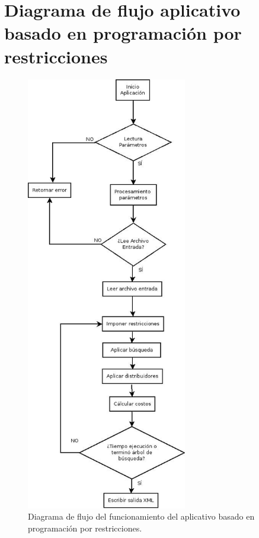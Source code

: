 \section*{Diagrama de flujo aplicativo basado en programación por restricciones} \label{flujoApp}

\begin{figure}[H]
	\centering
	\includegraphics[width=7cm]{Anexos/Imagenes/Aplicativo.jpeg}
	\caption{Diagrama de flujo del funcionamiento del aplicativo basado en programación por restricciones.}
	\label{fig:modeloER}	
\end{figure}


